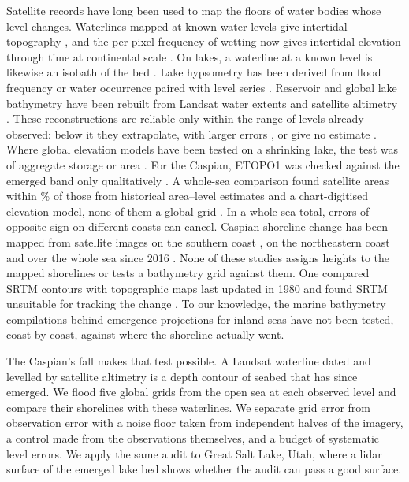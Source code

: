 Satellite records have long been used to map the floors of water bodies whose level changes. Waterlines mapped at known water levels give intertidal topography \citep{mason1995,mason1997,heygster2010,sagar2017,bishoptaylor2019}, and the per-pixel frequency of wetting now gives intertidal elevation through time at continental scale \citep{bishoptaylor2026}. On lakes, a waterline at a known level is likewise an isobath of the bed \citep{feng2011,schroder2022}. Lake hypsometry has been derived from flood frequency or water occurrence paired with level series \citep{cretaux2016,busker2019,fassoniandrade2020,armon2020}. Reservoir and global lake bathymetry have been rebuilt from Landsat water extents and satellite altimetry \citep{getirana2018,li2020,huang2025}. These reconstructions are reliable only within the range of levels already observed: below it they extrapolate, with larger errors \citep{li2020}, or give no estimate \citep{huang2025}. Where global elevation models have been tested on a shrinking lake, the test was of aggregate storage or area \citep{huang2026,bocharov2026}. For the Caspian, ETOPO1 was checked against the emerged band only qualitatively \citep{akbari2020}. A whole-sea comparison found satellite areas within \% of those from historical area--level estimates and a chart-digitised elevation model, none of them a global grid \citep{bocharov2026}. In a whole-sea total, errors of opposite sign on different coasts can cancel. Caspian shoreline change has been mapped from satellite images on the southern coast \citep{toorani2021}, on the northeastern coast \citep{kamza2023,krylenko2026} and over the whole sea since 2016 \citep{dedova2026a}. None of these studies assigns heights to the mapped shorelines or tests a bathymetry grid against them. One compared SRTM contours with topographic maps last updated in 1980 and found SRTM unsuitable for tracking the change \citep{kamza2023}. To our knowledge, the marine bathymetry compilations behind emergence projections for inland seas have not been tested, coast by coast, against where the shoreline actually went.

The Caspian's fall makes that test possible. A Landsat waterline dated and levelled by satellite altimetry is a depth contour of seabed that has since emerged. We flood five global grids from the open sea at each observed level and compare their shorelines with these waterlines. We separate grid error from observation error with a noise floor taken from independent halves of the imagery, a control made from the observations themselves, and a budget of systematic level errors. We apply the same audit to Great Salt Lake, Utah, where a lidar surface of the emerged lake bed shows whether the audit can pass a good surface.

